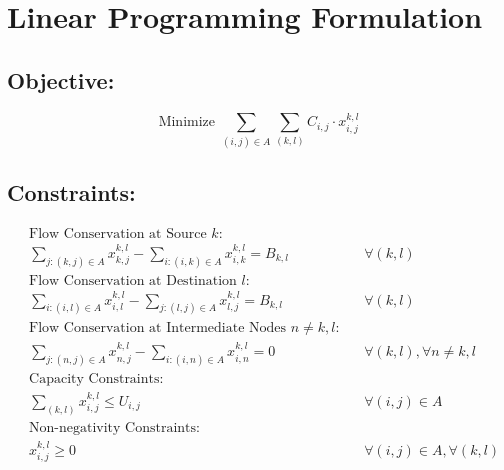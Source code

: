 \documentclass{article}
\begin{document}
\section*{Linear Programming Formulation}

\subsection*{Objective:}
\[
\text{Minimize } \sum_{(i,j) \in A} \sum_{(k,l)} C_{i,j} \cdot x_{i,j}^{k,l}
\]

\subsection*{Constraints:}

\begin{align*}
& \text{Flow Conservation at Source } k: \\
& \sum_{j: (k,j) \in A} x_{k,j}^{k,l} - \sum_{i: (i,k) \in A} x_{i,k}^{k,l} = B_{k,l} && \forall (k,l) \\

& \text{Flow Conservation at Destination } l: \\
& \sum_{i: (i,l) \in A} x_{i,l}^{k,l} - \sum_{j: (l,j) \in A} x_{l,j}^{k,l} = B_{k,l} && \forall (k,l) \\

& \text{Flow Conservation at Intermediate Nodes } n \neq k, l: \\
& \sum_{j: (n,j) \in A} x_{n,j}^{k,l} - \sum_{i: (i,n) \in A} x_{i,n}^{k,l} = 0 && \forall (k,l), \forall n \neq k,l \\

& \text{Capacity Constraints:} \\
& \sum_{(k,l)} x_{i,j}^{k,l} \leq U_{i,j} && \forall (i,j) \in A \\

& \text{Non-negativity Constraints:} \\
& x_{i,j}^{k,l} \geq 0 && \forall (i,j) \in A, \forall (k,l)

\end{align*}
\end{document}

